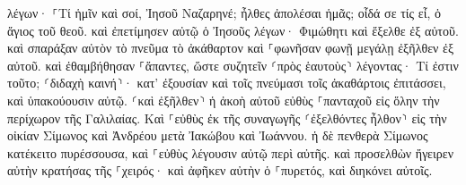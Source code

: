 \documentclass{openreader}
\begin{document}
λέγων· ⸀Τί ἡμῖν καὶ σοί, Ἰησοῦ Ναζαρηνέ; ἦλθες ἀπολέσαι ἡμᾶς; οἶδά σε τίς εἶ, ὁ ἅγιος τοῦ θεοῦ. 
καὶ ἐπετίμησεν αὐτῷ ὁ Ἰησοῦς λέγων· Φιμώθητι καὶ ἔξελθε ἐξ αὐτοῦ. 
καὶ σπαράξαν αὐτὸν τὸ πνεῦμα τὸ ἀκάθαρτον καὶ ⸀φωνῆσαν φωνῇ μεγάλῃ ἐξῆλθεν ἐξ αὐτοῦ. 
καὶ ἐθαμβήθησαν ⸀ἅπαντες, ὥστε συζητεῖν ⸂πρὸς ἑαυτοὺς⸃ λέγοντας· Τί ἐστιν τοῦτο; ⸂διδαχὴ καινή⸃· κατ’ ἐξουσίαν καὶ τοῖς πνεύμασι τοῖς ἀκαθάρτοις ἐπιτάσσει, καὶ ὑπακούουσιν αὐτῷ. 
⸂καὶ ἐξῆλθεν⸃ ἡ ἀκοὴ αὐτοῦ εὐθὺς ⸀πανταχοῦ εἰς ὅλην τὴν περίχωρον τῆς Γαλιλαίας. 
Καὶ ⸀εὐθὺς ἐκ τῆς συναγωγῆς ⸂ἐξελθόντες ἦλθον⸃ εἰς τὴν οἰκίαν Σίμωνος καὶ Ἀνδρέου μετὰ Ἰακώβου καὶ Ἰωάννου. 
ἡ δὲ πενθερὰ Σίμωνος κατέκειτο πυρέσσουσα, καὶ ⸀εὐθὺς λέγουσιν αὐτῷ περὶ αὐτῆς. 
καὶ προσελθὼν ἤγειρεν αὐτὴν κρατήσας τῆς ⸀χειρός· καὶ ἀφῆκεν αὐτὴν ὁ ⸀πυρετός, καὶ διηκόνει αὐτοῖς. 
\end{document}
